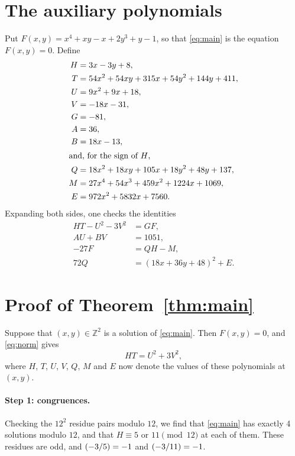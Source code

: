 \documentclass[11pt]{article}
\newcommand{\Z}{\mathbb{Z}}
\newcommand{\leg}[2]{\mathchoice{\biggl(\dfrac{#1}{#2}\biggr)}{(#1/#2)}{(#1/#2)}{(#1/#2)}}
\begin{document}
\section{The auxiliary polynomials}

Put $F(x,y)=x^{4}+xy-x+2y^{3}+y-1$, so that \eqref{eq:main} is the equation $F(x,y)=0$. Define
\begin{align*}
H&=3x-3y+8,\\
T&=54x^{2}+54xy+315x+54y^{2}+144y+411,\\
U&=9x^{2}+9x+18,\\
V&=-18x-31,\\
G&=-81,\\
A&=36,\\
B&=18x-13,\\
\intertext{and, for the sign of $H$,}
Q&=18x^{2}+18xy+105x+18y^{2}+48y+137,\\
M&=27x^{4}+54x^{3}+459x^{2}+1224x+1069,\\
E&=972x^{2}+5832x+7560.
\end{align*}
Expanding both sides, one checks the identities
\begin{align}
HT-U^2-3V^2&=GF,\label{eq:norm}\\
AU+BV&=1051,\label{eq:bezout}\\
-27F&=QH-M,\label{eq:sign}\\
72Q&=(18x+36y+48)^2+E.\label{eq:sign2}
\end{align}

\section{Proof of Theorem~\ref{thm:main}}

Suppose that $(x,y)\in\Z^2$ is a solution of \eqref{eq:main}. Then $F(x,y)=0$, and \eqref{eq:norm} gives
\begin{equation}\label{eq:HT}
HT=U^2+3V^2,
\end{equation}
where $H$, $T$, $U$, $V$, $Q$, $M$ and $E$ now denote the values of these polynomials at $(x,y)$.

\paragraph{Step 1: congruences.} Checking the $12^2$ residue pairs modulo $12$, we find that \eqref{eq:main} has exactly 4 solutions modulo $12$, and that $H\equiv5\text{ or }11\pmod{12}$ at each of them. These residues are odd, and $\leg{-3}{5}=-1$ and $\leg{-3}{11}=-1$.
\end{document}

